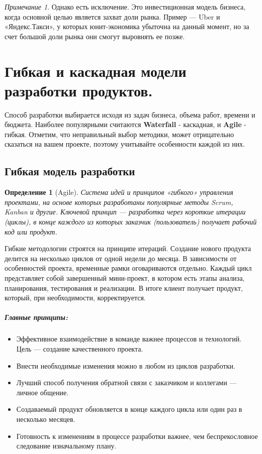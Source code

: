 \documentclass[11pt]{article}
\theoremstyle{plain} %
\newtheorem{proposition}[theorem]{Определение}
\theoremstyle{definition} %
\theoremstyle{remark} %
\newtheorem{nota}{Примечание}
\begin{document}
\begin{nota}
	Однако есть исключение. Это инвестиционная модель бизнеса, когда основной целью является захват доли рынка. Пример — Uber и «Яндекс.Такси», у которых юнит-экономика убыточна на данный момент, но за счет большой доли рынка они смогут выровнять ее позже.
\end{nota}

\newpage

\section{Гибкая и каскадная модели разработки продуктов.}\label{erste}

Способ разработки выбирается исходя из задач бизнеса, объема работ, времени и бюджета. Наиболее популярными считаются \textbf{Waterfall} - каскадная, и \textbf{Agile} - гибкая. Отметим, что неправильный выбор методики, может отрицательно сказаться на вашем проекте, поэтому учитывайте особенности каждой из них.

\subsection{Гибкая модель разработки}

\begin{proposition}[Agile]
	Система идей и принципов «гибкого» управления проектами, на основе которых разработаны популярные методы Scrum, Kanban и другие. Ключевой принцип — разработка через короткие итерации (циклы), в конце каждого из которых заказчик (пользователь) получает рабочий код или продукт.
\end{proposition}

Гибкие методологии строятся на принципе итераций. Создание нового продукта делится на несколько циклов от одной недели до месяца. В зависимости от особенностей проекта, временные рамки оговариваются отдельно. Каждый цикл представляет собой завершенный мини-проект, в котором есть этапы анализа, планирования, тестирования и реализации. В итоге клиент получает продукт, который, при необходимости, корректируется.

\subparagraph{Главные принципы:}
\begin{itemize}
	\item Эффективное взаимодействие в команде важнее процессов и технологий. Цель --- создание качественного проекта.
	\item Внести необходимые изменения можно в любом из циклов разработки.
	\item Лучший способ получения обратной связи с заказчиком и коллегами --- личное общение.
	\item Создаваемый продукт обновляется в конце каждого цикла или один раз в несколько месяцев.
	\item Готовность к изменениям в процессе разработки важнее, чем беспрекословное следование изначальному плану.
\end{itemize}
\end{document}
